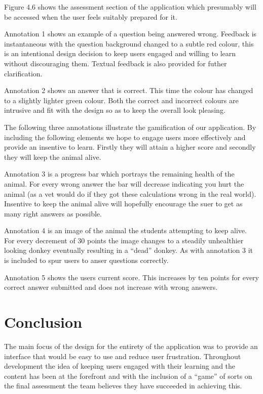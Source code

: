 \documentclass{l3proj}
\begin{document}
Figure 4.6 shows the assessment section of the application which presumably will be accessed when the user feels suitably prepared for it.

Annotation 1 shows an example of a question being answered wrong. Feedback is instantaneous with the question background changed to a subtle red colour, this is an intentional design decision to keep users engaged and willing to learn without discouraging them. Textual feedback is also provided for futher clarification. 

Annotation 2 shows an answer that is correct. This time the colour has changed to a slightly lighter green colour. Both the correct and incorrect colours are intrusive and fit with the design so as to keep the overall look pleasing.

The following three annotations illustrate the gamification of our application. By including the following elements we hope to engage users more effectively and provide an insentive to learn. Firstly they will attain a higher score and secondly they will keep the animal alive.

Annotation 3 is a progress bar which portrays the remaining health of the animal. For every wrong answer the bar will decrease indicating you hurt the animal (as a vet would do if they got these calculations wrong in the real world). Insentive to keep the animal alive will hopefully encourage the suer to get as many right answers as possible.

Annotation 4 is an image of the animal the students attempting to keep alive. For every decrement of 30 points the image changes to a steadily unhealthier looking donkey eventually resulting in a ``dead'' donkey. As with annotation 3 it is included to spur users to anser questions correctly.

Annotation 5 shows the users current score. This increases by ten points for every correct answer submitted and does not increase with wrong answers. 

\section{Conclusion}

The main focus of the design for the entirety of the application was to provide an interface that would be easy to use and reduce user frustration. Throughout development the idea of keeping users engaged with their learning and the content has been at the forefront and with the inclusion of a ``game'' of sorts on the final assessment the team believes they have succeeded in achieving this.
\end{document}
